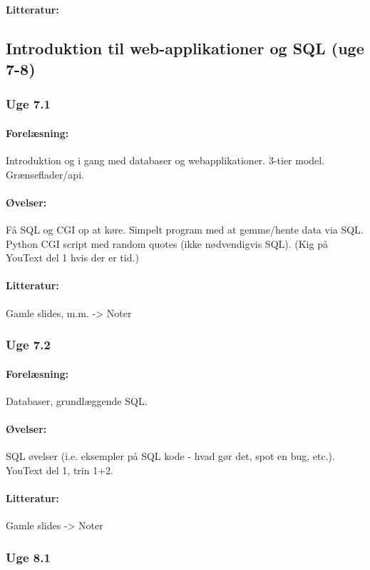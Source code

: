 \documentclass[12pt]{article}
\begin{document}
\paragraph{Litteratur:}

\subsection{Introduktion til web-applikationer og SQL (uge 7-8)}
\subsubsection{Uge 7.1}
\paragraph{Forelæsning:} 
Introduktion og i gang med databaser og webapplikationer.
3-tier model. Grænseflader/api.
\paragraph{Øvelser:}
Få SQL og CGI op at køre.
Simpelt program med at gemme/hente data via SQL.
Python CGI script med random quotes (ikke nødvendigvis SQL).
(Kig på YouText del 1 hvis der er tid.)
\paragraph{Litteratur:} Gamle slides, m.m. -> Noter

\subsubsection{Uge 7.2}
\paragraph{Forelæsning:}
Databaser, grundlæggende SQL.
\paragraph{Øvelser:}
SQL øvelser (i.e. eksempler på SQL kode - hvad gør det, spot en bug, etc.).
YouText del 1, trin 1+2.
\paragraph{Litteratur:} Gamle slides -> Noter 

\subsubsection{Uge 8.1}
\end{document}
